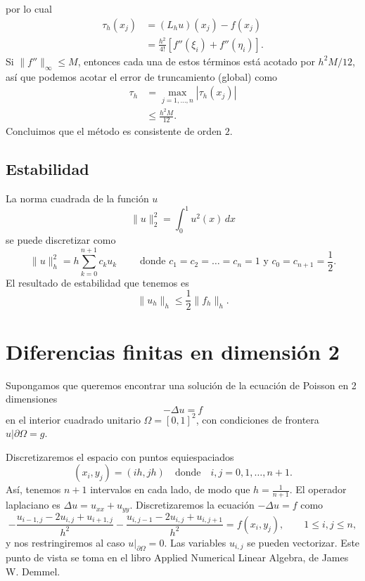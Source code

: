\documentclass[11pt,letterpaper]{report}
\begin{document}
por lo cual
\begin{align}
  \tau_{h}(x_j)
  &= (L_hu)(x_j) - f(x_j) \\
  &=
    \frac{h^{2}}{4!} [ f''(\xi_i) + f''(\eta_i) ]
.\end{align}
Si $\|f''\|_{\infty}\leq M$, entonces cada una de estos términos está
acotado por $h^{2}M/12$, así que podemos acotar el error de
truncamiento (global) como
\begin{align}
  \tau_{h}
  &= \max_{j=1,\dots,n} |\tau_{h}(x_j)| \\
  &\leq \frac{h^{2}M}{12}
.\end{align}
Concluimos que el método es consistente de orden $2$.

\subsection{Estabilidad}

La norma cuadrada de la función $u$
\begin{equation}
  \|u\|^{2}_2 = \int_{0}^{1}u^{2}(x)\,dx
\end{equation}
se puede discretizar como
\begin{equation}
  \|u\|^{2}_h = h\sum_{k=0}^{n+1}c_ku_k
  \qquad \text{ donde }
  c_1=c_2=\dots=c_n=1 
  \text{ y }
  c_0=c_{n+1}=\frac{1}{2}.
\end{equation}
El resultado de estabilidad que tenemos es
\begin{equation}
  \|u_h\|_h \leq \frac{1}{2} \|f_h\|_h
.\end{equation}


\section{Diferencias finitas en dimensión 2}

Supongamos que queremos encontrar una solución de la ecuación de
Poisson en 2 dimensiones
\begin{equation}
  -\Delta u = f
\end{equation}
en el interior cuadrado unitario $\Omega=[0,1]^{2}$, con condiciones
de frontera $u|\partial\Omega = g$.

Discretizaremos el espacio con puntos equiespaciados
\begin{equation}
  (x_i,y_j)=(ih,jh) \quad \text{donde} \quad i,j=0,1,\dots,n+1
.\end{equation}
Así, tenemos $n+1$ intervalos en cada lado, de modo que
$h=\frac{1}{n+1}$.
El operador laplaciano es $\Delta u = u_{xx}+u_{yy}$. Discretizaremos
la ecuación $-\Delta u = f$ como
\begin{equation}
  -\frac{u_{i-1,j} - 2u_{i,j} + u_{i+1,j}}{h^{2}}
  -\frac{u_{i,j-1} - 2u_{i,j} + u_{i,j+1}}{h^{2}}
  =
  f(x_i,y_j),
  \qquad
  1\leq i,j\leq n
,\end{equation}
y nos restringiremos al caso $u|_{\partial\Omega}=0$.
Las variables $u_{i,j}$ se pueden vectorizar. Este punto de vista se
toma en el libro Applied Numerical Linear Algebra, de James W.
Demmel.
\end{document}
